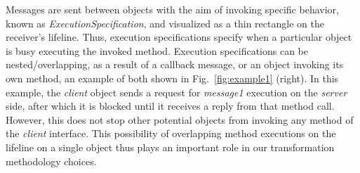 \documentclass[letter]{llncs}
\newcommand{\subsecshrinkbegin}{\vspace{-.2cm}}
\begin{document}
Messages are sent between objects with the aim of invoking specific behavior, known as
\emph{ExecutionSpecification}, and visualized as a thin rectangle on the receiver's lifeline. Thus,
execution specifications specify when a particular object is busy executing the invoked method.
Execution specifications can be nested/overlapping, as a result of a callback message, or 
an object invoking its own method, an example of both shown in Fig.~\ref{fig:example1} (right).
In this example,
the \emph{client} object sends a request for \emph{message1} execution on the \emph{server} side, after which 
it is blocked until it receives a reply from that method call. However, this does not stop other potential objects
from invoking any method of the \emph{client} interface. This possibility of overlapping method executions
on the lifeline on a single object thus plays an important role in our transformation methodology choices.
\subsecshrinkbegin
\end{document}
